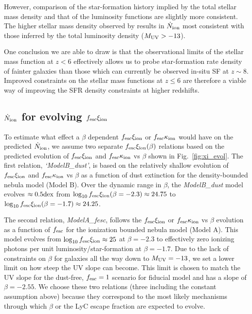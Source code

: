However, comparison of the star-formation history implied by the \citet{Grazian:2014vx} total stellar mass density and that of the \citet{Finkelstein:2014ub} luminosity functions are slightly more consistent. The higher stellar mass density observed by \citet{Duncan:2014gh} results in $\dot{N}_{\rm{ion}}$ most consistent with those inferred by the \citet{Bouwens:2014tx} total luminosity density ($M_{\rm{UV}} > -13$). 

One conclusion we are able to draw is that the observational limits of the stellar mass function at $z < 6$ effectively allows us to probe star-formation rate density of fainter galaxies than those which can currently be observed in-situ SF at $z\sim8$. Improved constraints on the stellar mass functions at $z \leq 6$ are therefore a viable way of improving the SFR density constraints at higher redshifts. 

\subsection{$\dot{N}_{\rm{ion}}$ for evolving $f_{\rm{esc}}\xi_{\rm{ion}}$}

To estimate what effect a $\beta$ dependent $f_{\rm{esc}}\xi_{\rm{ion}}$ or $f_{\rm{esc}}\kappa_{\rm{ion}}$ would have on the predicted $\dot{N}_{\rm{ion}}$, we assume two separate $f_{\rm{esc}}\xi_{\rm{ion}}(\beta)$ relations based on the predicted evolution of $f_{\rm{esc}}\xi_{\rm{ion}}$ and $f_{\rm{esc}}\kappa_{\rm{ion}}$ vs $\beta$ shown in Fig.~\ref{fig:xi_evol}. The first relation,  \emph{`ModelB\_dust'}, is based on the relatively shallow evolution of $f_{\rm{esc}}\xi_{\rm{ion}}$ and $f_{\rm{esc}}\kappa_{\rm{ion}}$ vs $\beta$ as a function of dust extinction for the density-bounded nebula model (Model B). Over the dynamic range in $\beta$, the \emph{ModelB\_dust} model evolves $\approx 0.5\/\rm{dex}$ from $\log_{10}f_{\rm{esc}}\xi_{\rm{ion}}(\beta = -2.3) \approx 24.75$ to $\log_{10}f_{\rm{esc}}\xi_{\rm{ion}}(\beta = -1.7) \approx 24.25$. 

The second relation, \emph{ModelA\_fesc}, follows the $f_{\rm{esc}}\xi_{\rm{ion}}$ or $f_{\rm{esc}}\kappa_{\rm{ion}}$ vs $\beta$ evolution as a function of $f_{\rm{esc}}$ for the ionization bounded nebula model (Model A). This model evolves from $\log_{10}f_{\rm{esc}}\xi_{\rm{ion}} \approx 25$ at $\beta = -2.3$ to effectively zero ionizing photons per unit luminosity/star-formation at $\beta = -1.7$. Due to the lack of constraints on $\beta$ for galaxies all the way down to $M_{\rm{UV}} = -13$, we set a lower limit on how steep the UV slope can become. This limit is chosen to match the UV slope for the dust-free, $f_{\rm{esc}} = 1$ scenario for fiducial model and has a slope of $\beta = -2.55$. We choose these two relations (three including the constant assumption above) because they correspond to the most likely mechanisms through which $\beta$ or the LyC escape fraction are expected to evolve.

